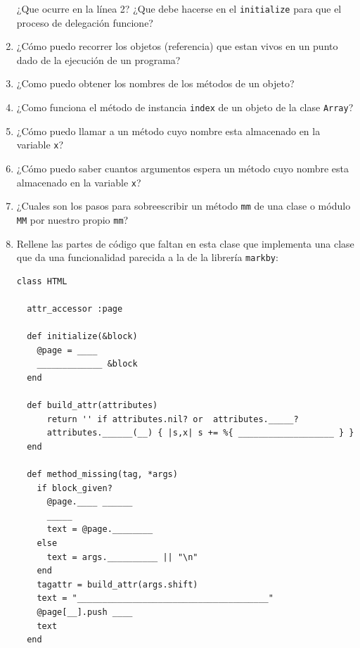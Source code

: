 \begin{enumerate}
\begin{verbatim}
\end{verbatim}
¿Que ocurre en la línea 2?
¿Que debe hacerse en el \verb|initialize| para que el proceso de delegación funcione?
\item ¿Cómo puedo recorrer los objetos (referencia) que estan vivos en un punto dado de la 
ejecución de un programa? %
\item ¿Como puedo obtener los nombres de los métodos de un objeto? %
\item ¿Como funciona el método de instancia \verb|index| de un objeto de la clase \verb|Array|?
\item
¿Cómo puedo llamar a un método cuyo nombre esta almacenado en la variable \verb|x|?
\item
¿Cómo puedo saber cuantos argumentos espera un método cuyo nombre esta almacenado en la variable \verb|x|?
\item ¿Cuales son los pasos para sobreescribir un método \verb|mm| de una clase o módulo \verb|MM|
por nuestro propio \verb|mm|?

\item
Rellene las partes de código que faltan en esta clase que implementa una clase
que da una funcionalidad parecida a la de la librería \verb|markby|:
\begin{verbatim}
class HTML

  attr_accessor :page

  def initialize(&block)
    @page = ____
    _____________ &block
  end

  def build_attr(attributes)
      return '' if attributes.nil? or  attributes._____?
      attributes.______(__) { |s,x| s += %{ ___________________ } } 
  end

  def method_missing(tag, *args)
    if block_given?
      @page.____ ______
      _____ 
      text = @page.________
    else
      text = args.__________ || "\n"
    end
    tagattr = build_attr(args.shift) 
    text = "______________________________________"
    @page[__].push ____
    text
  end


\end{verbatim}
\end{enumerate}
